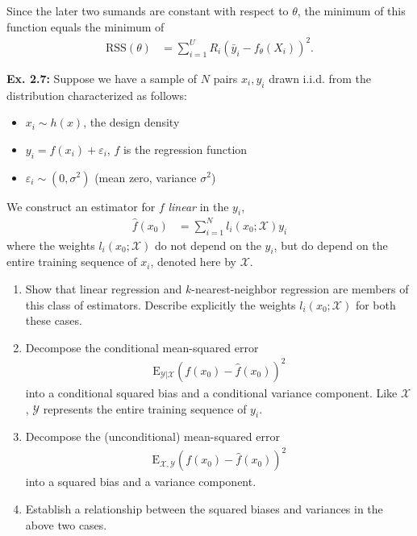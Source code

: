 \documentclass{article}
\begin{document}
Since the later two sumands are constant with respect to $\theta$, the minimum of this function equals the minimum of
\begin{align}
	\mathrm{RSS}(\theta)&=\sum_{i=1}^UR_i\left(\bar{y}_i-f_\theta(X_i)\right)^2.
\end{align}

\textbf{Ex. 2.7: }Suppose we have a sample of $N$ pairs $x_i,y_i$ drawn i.i.d. from the distribution characterized as follows:
\begin{itemize}
	\item $x_i\sim h(x)$, the design density
	\item $y_i=f(x_i)+\varepsilon_i$, $f$ is the regression function
	\item $\varepsilon_i\sim(0,\sigma^2)$ (mean zero, variance $\sigma^2$)
\end{itemize}

We construct an estimator for $f$ \textit{linear} in the $y_i$,
\begin{align}
	\hat{f}(x_0)&=\sum_{i=1}^Nl_i(x_0;\mathcal X)y_i
\end{align}
where the weights $l_i(x_0;\mathcal X)$ do not depend on the $y_i$, but do depend on the entire training sequence of $x_i$, denoted here by $\mathcal X$.

\begin{enumerate}[label=\alph*]
	\item Show that linear regression and $k$-nearest-neighbor regression are members of this class of estimators. Describe explicitly the weights $l_i(x_0;\mathcal X)$ for both these cases.
	\item Decompose the conditional mean-squared error
		\begin{align}
			\mathrm E_{\mathcal Y|\mathcal X}\left(f(x_0)-\hat{f}(x_0)\right)^2
		\end{align}
		into a conditional squared bias and a conditional variance component.
		Like $\mathcal X$, $\mathcal Y$ represents the entire training sequence of $y_i$.
	\item Decompose the (unconditional) mean-squared error
		\begin{align}
			\mathrm E_{\mathcal X,\mathcal Y}\left(f(x_0)-\hat{f}(x_0)\right)^2
		\end{align}
		into a squared bias and a variance component.
	\item Establish a relationship between the squared biases and variances in the above two cases.
\end{enumerate}
\end{document}
